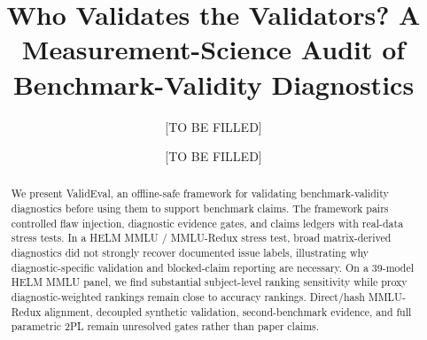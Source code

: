 \documentclass[11pt]{article}
\title{Who Validates the Validators? A Measurement-Science Audit of Benchmark-Validity Diagnostics}
\author{[TO BE FILLED]}
\date{[TO BE FILLED]}
\begin{document}
\maketitle

\begin{abstract}
We present ValidEval, an offline-safe framework for validating benchmark-validity diagnostics before using them to support benchmark claims. The framework pairs controlled flaw injection, diagnostic evidence gates, and claims ledgers with real-data stress tests. In a HELM MMLU / MMLU-Redux stress test, broad matrix-derived diagnostics did not strongly recover documented issue labels, illustrating why diagnostic-specific validation and blocked-claim reporting are necessary.
On a 39-model HELM MMLU panel, we find substantial subject-level ranking sensitivity while proxy diagnostic-weighted rankings remain close to accuracy rankings. Direct/hash MMLU-Redux alignment, decoupled synthetic validation, second-benchmark evidence, and full parametric 2PL remain unresolved gates rather than paper claims.
\end{abstract}














\end{document}
